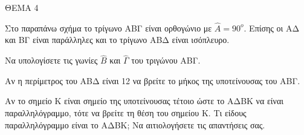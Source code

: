 
ΘΕΜΑ 4



Στο παραπάνω σχήμα το τρίγωνο ΑΒΓ είναι ορθογώνιο με $\widehat{Α} = 90^{ο}$. Επίσης οι ΑΔ και ΒΓ είναι παράλληλες και το τρίγωνο ΑΒΔ είναι ισόπλευρο.

\begin{alist}
\item Να υπολογίσετε τις γωνίες $\widehat{Β}$ και $\widehat{\Gamma}$ του τριγώνου ΑΒΓ.


\item Αν η περίμετρος του ΑΒΔ είναι 12 να βρείτε το μήκος της υποτείνουσας του ΑΒΓ.


\item Αν το σημείο Κ είναι σημείο της υποτείνουσας τέτοιο ώστε το ΑΔΒΚ να είναι παραλληλόγραμμο, τότε να βρείτε τη θέση του σημείου Κ. Τι είδους παραλληλόγραμμο είναι το ΑΔΒΚ; Να αιτιολογήσετε τις απαντήσεις σας.

\end{alist}
